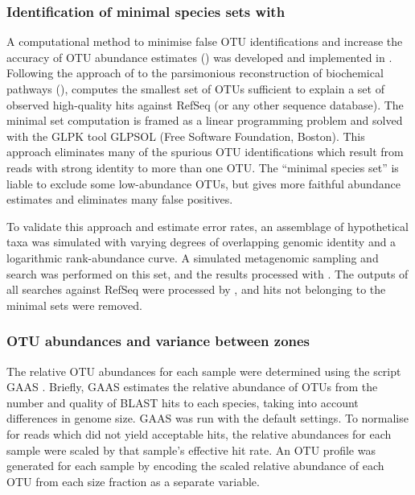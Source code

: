 \subsubsection{Identification of minimal species sets with }

A computational method to minimise false \ac{OTU} identifications and increase the accuracy of \ac{OTU} abundance estimates () was developed and implemented in .
Following the approach of \citet{Ye:2009bl} to the parsimonious reconstruction of biochemical pathways (),  computes the smallest set of OTUs sufficient to explain a set of observed high-quality hits against RefSeq (or any other sequence database).
The minimal set computation is framed as a linear programming problem and solved with the \ac{GLPK} tool \ac{GLPSOL} (Free Software Foundation, Boston).
This approach eliminates many of the spurious \ac{OTU} identifications which result from reads with strong identity to more than one \ac{OTU}. 
The ``minimal species set'' is liable to exclude some low-abundance \acp{OTU}, but gives more faithful abundance estimates and eliminates many false positives.

To validate this approach and estimate error rates, an assemblage of hypothetical taxa was simulated with varying degrees of overlapping genomic identity and a logarithmic rank-abundance curve. 
A simulated metagenomic sampling and  search was performed on this set, and the results processed with .
The outputs of all  searches against RefSeq were processed by , and hits not belonging to the minimal sets were removed.

\subsubsection{\ac{OTU} abundances and variance between zones}

The relative \ac{OTU} abundances for each sample were determined using the  script \ac{GAAS} \cite{Angly:2009ip}.
Briefly, \ac{GAAS} estimates the relative abundance of OTUs from the number and quality of BLAST hits to each species, taking into account differences in genome size. 
\ac{GAAS} was run with the default settings. 
To normalise for reads which did not yield acceptable hits, the relative abundances for each sample were scaled by that sample's effective  hit rate. 
An \ac{OTU} profile was generated for each sample by encoding the scaled relative abundance of each \ac{OTU} from each size fraction as a separate variable.

